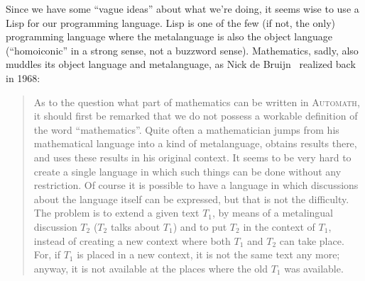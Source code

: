 \M
Since we have some ``vague ideas'' about what we're doing, it seems wise
to use a Lisp for our programming language. Lisp is one of the few (if not, the
only) programming language where the metalanguage is also the object
language (``homoiconic'' in a strong sense, not a buzzword sense).
Mathematics, sadly, also muddles its object language and metalanguage,
as Nick de Bruijn~\cite{de-bruijn:aut001} realized back in 1968:
\begin{quote}
As to the question what part of mathematics can be written in \textsc{Automath},
it should first be remarked that we do not possess a workable definition
of the word ``mathematics''. Quite often a mathematician jumps from his
mathematical language into a kind of metalanguage, obtains results
there, and uses these results in his original context. It seems to be
very hard to create a single language in which such things can be done
without any restriction. Of course it is possible to have a language in
which discussions about the language itself can be expressed, but that
is not the difficulty. The problem is to extend a given text $T_{1}$, by
means of a metalingual discussion $T_{2}$ ($T_{2}$ talks about $T_{1}$) and to put $T_{2}$
in the context of $T_{1}$, instead of creating a new context where both $T_{1}$
and $T_{2}$ can take place. For, if $T_{1}$ is placed in a new context, it is not
the same text any more; anyway, it is not available at the places where
the old $T_{1}$ was available.
\end{quote}
